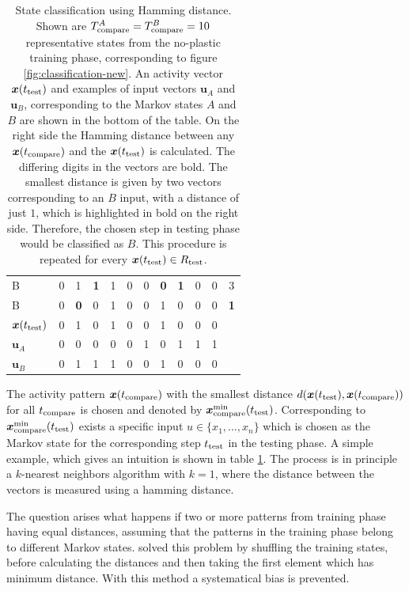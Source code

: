 \begin{table}[!b]
\begin{tabular}{l|llllllllll|c}
B & 0 & 1 & \textbf{1} & 1 & 0 & 0 & \textbf{0} & \textbf{1} & 0 & 0 & 3 \\
B & 0 & \textbf{0} & 0 & 1 & 0 & 0 & 1 & 0 & 0 & 0 & \textbf{1} \\
\hline
\hline
$\bm x(t_{\text{test}})$ & 0 & 1 & 0 & 1 & 0 & 0 & 1 & 0 & 0 & 0 &  \\
\hline
$\bm u_A$ & 0 & 0 & 0 & 0 & 0 & 1 & 0 & 1 & 1 & 1 &  \\
$\bm u_B$ & 0 & 1 & 1 & 1 & 0 & 0 & 1 & 0 & 0 & 0 & 
\end{tabular}
\vspace{5pt}
\caption[State classification using Hamming distance]{State classification using Hamming distance. Shown are $T_{\text{compare}}^A = T_{\text{compare}}^B = 10$ representative states from the no-plastic training phase, corresponding to figure \ref{fig:classification-new}. An activity vector $\bm x(t_{\text{test}})$ and examples of input vectors $\bm u_A$ and $\bm u_B$, corresponding to the Markov states $A$ and $B$ are shown in the bottom of the table. On the right side the Hamming distance between any $\bm x(t_{\text{compare}})$ and the $\bm x(t_{\text{test}})$ is calculated. The differing digits in the vectors are bold. The smallest distance is given by two vectors corresponding to an $B$ input, with a distance of just $1$, which is highlighted in bold on the right side. Therefore, the chosen step in testing phase would be classified as $B$. This procedure is repeated for every $\bm x(t_{\text{test}}) \in R_{\text{test}}$.}
\label{tb:hamming}
\end{table}

The activity pattern $\bm x(t_{\text{compare}})$ with the smallest distance $d(\bm x(t_{\text{test}}), \bm x(t_{\text{compare}}))$ for all $t_{\text{compare}}$ is chosen and denoted by $\bm x^{\text{min}}_{\text{compare}}(t_{\text{test}})$. Corresponding to $\bm x^{\text{min}}_{\text{compare}}(t_{\text{test}})$ exists a specific input $u \in \{x_1, ..., x_n\}$ which is chosen as the Markov state for the corresponding step $t_{\text{test}}$ in the testing phase. A simple example, which gives an intuition is shown in table \ref{tb:hamming}. The process is in principle a $k$-nearest neighbors algorithm with $k=1$, where the distance between the vectors is measured using a hamming distance.

The question arises what happens if two or more patterns from training phase having equal distances, assuming that the patterns in the training phase belong to different Markov states. \textcite{hartmann2015s} solved this problem by shuffling the training states, before calculating the distances and then taking the first element which has minimum distance. With this method a systematical bias is prevented.

